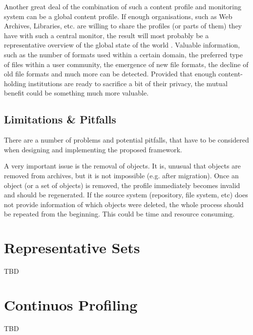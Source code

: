 Another great deal of the combination of such a content profile and monitoring system can be a global content profile. If enough organisations, such as Web Archives, Libraries, etc. are willing to share the profiles (or parts of them) they have with such a central monitor, the result will most probably be a representative overview of the global state of the world \cite{duretec:2012:watch}. Valuable information, such as the number of formats used within a certain domain, the preferred type of files within a user community, the emergence of new file formats, the decline of old file formats and much more can be detected. Provided that enough content-holding institutions are ready to sacrifice a bit of their privacy, the mutual benefit could be something much more valuable.

\subsection{Limitations \& Pitfalls}
There are a number of problems and potential pitfalls, that have to be considered when designing and implementing the proposed framework.

A very important issue is the removal of objects. It is, unusual that objects are removed from archives, but it is not impossible (e.g. after migration). Once an object (or a set of objects) is removed, the profile immediately becomes invalid and should be regenerated. If the source system (repository, file system, etc) does not provide information of which objects were deleted, the whole process should be repeated from the beginning. This could be time and resource consuming.


\section{Representative Sets}
\label{sec:representative_sets}
TBD

\section{Continuos Profiling}
TBD
